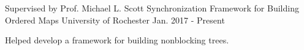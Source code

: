 \begin{cventries}
  \cventry
    {Supervised by Prof. Michael L. Scott} %
    {Synchronization Framework for Building Ordered Maps} %
    {University of Rochester} %
    {Jan. 2017 - Present} %
    {
      \begin{cvitems} %
        \item {Helped develop a framework for building nonblocking trees.}
      \end{cvitems}
    }
\end{cventries}
